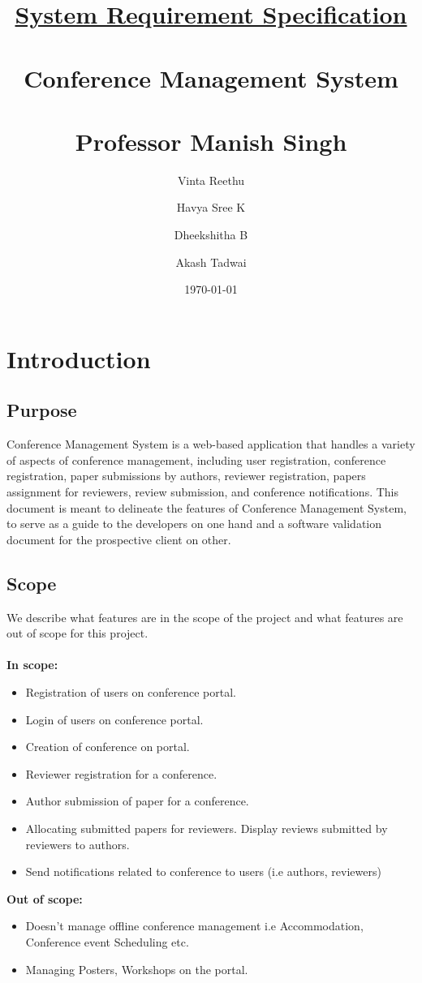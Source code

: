 \documentclass[english,a4paper,12pt]{report}
\title{\textbf{\underline{\Huge{System Requirement Specification}}}\\~\\
\textbf{Conference Management System}\\~\\ 
Professor Manish Singh\\
}
\author{Vinta Reethu \and Havya Sree K \and Dheekshitha B \and Akash Tadwai }
\date{\today}
\begin{document}
\titleformat{\chapter}[display]   
{\normalfont\huge\bfseries}{\chaptertitlename\ \thechapter}{20pt}{\Huge}   
\titlespacing*{\chapter}{0pt}{-10pt}{40pt}
\maketitle

\newpage

\tableofcontents

\chapter{Introduction}
\section{Purpose}
Conference Management System is a web-based application that handles a variety of aspects of conference management, including user registration, conference registration, paper submissions by authors, reviewer registration, papers assignment for reviewers, review submission, and conference notifications. This document is meant to delineate the features of Conference Management System, to serve as a guide to the developers on one hand and a software validation document for the prospective client on other.

\section{Scope}
We describe what features are in the scope of the project and what features are out of scope for this project.\\~\\
\textbf{In scope:}
\begin{itemize}
    \item Registration of users on conference portal.
    \item Login of users on conference portal.
    \item Creation of conference on portal.
    \item Reviewer registration for a conference.
    \item Author submission of paper for a conference.
    \item Allocating submitted papers for reviewers. Display reviews submitted by reviewers to authors.
    \item Send notifications related to conference to users (i.e authors, reviewers)
\end{itemize}
\textbf{Out of scope:}
\begin{itemize}
    \item Doesn't manage offline conference management i.e Accommodation, Conference event Scheduling etc.
    \item Managing Posters, Workshops on the portal.
\end{itemize}
\end{document}
